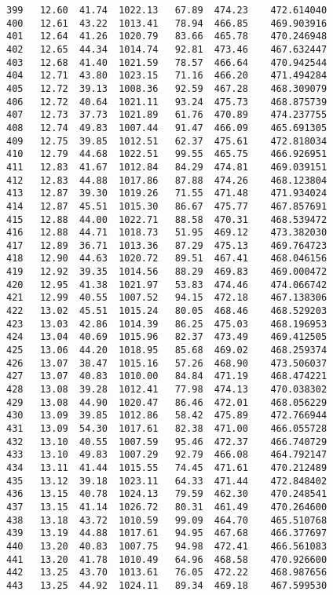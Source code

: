 \documentclass[11pt]{article}
\begin{document}
\begin{tcolorbox}[breakable, size=fbox, boxrule=.5pt, pad at break*=1mm, opacityfill=0]
\begin{Verbatim}[commandchars=\\\{\}]
399   12.60  41.74  1022.13   67.89  474.23    472.614040
400   12.61  43.22  1013.41   78.94  466.85    469.903916
401   12.64  41.26  1020.79   83.66  465.78    470.246948
402   12.65  44.34  1014.74   92.81  473.46    467.632447
403   12.68  41.40  1021.59   78.57  466.64    470.942544
404   12.71  43.80  1023.15   71.16  466.20    471.494284
405   12.72  39.13  1008.36   92.59  467.28    468.309079
406   12.72  40.64  1021.11   93.24  475.73    468.875739
407   12.73  37.73  1021.89   61.76  470.89    474.237755
408   12.74  49.83  1007.44   91.47  466.09    465.691305
409   12.75  39.85  1012.51   62.37  475.61    472.818034
410   12.79  44.68  1022.51   99.55  465.75    466.926951
411   12.83  41.67  1012.84   84.29  474.81    469.039151
412   12.83  44.88  1017.86   87.88  474.26    468.123804
413   12.87  39.30  1019.26   71.55  471.48    471.934024
414   12.87  45.51  1015.30   86.67  475.77    467.857691
415   12.88  44.00  1022.71   88.58  470.31    468.539472
416   12.88  44.71  1018.73   51.95  469.12    473.382030
417   12.89  36.71  1013.36   87.29  475.13    469.764723
418   12.90  44.63  1020.72   89.51  467.41    468.046156
419   12.92  39.35  1014.56   88.29  469.83    469.000472
420   12.95  41.38  1021.97   53.83  474.46    474.066742
421   12.99  40.55  1007.52   94.15  472.18    467.138306
422   13.02  45.51  1015.24   80.05  468.46    468.529203
423   13.03  42.86  1014.39   86.25  475.03    468.196953
424   13.04  40.69  1015.96   82.37  473.49    469.412505
425   13.06  44.20  1018.95   85.68  469.02    468.259374
426   13.07  38.47  1015.16   57.26  468.90    473.506037
427   13.07  40.83  1010.00   84.84  471.19    468.474221
428   13.08  39.28  1012.41   77.98  474.13    470.038302
429   13.08  44.90  1020.47   86.46  472.01    468.056229
430   13.09  39.85  1012.86   58.42  475.89    472.766944
431   13.09  54.30  1017.61   82.38  471.00    466.055728
432   13.10  40.55  1007.59   95.46  472.37    466.740729
433   13.10  49.83  1007.29   92.79  466.08    464.792147
434   13.11  41.44  1015.55   74.45  471.61    470.212489
435   13.12  39.18  1023.11   64.33  471.44    472.848402
436   13.15  40.78  1024.13   79.59  462.30    470.248541
437   13.15  41.14  1026.72   80.31  461.49    470.264600
438   13.18  43.72  1010.59   99.09  464.70    465.510768
439   13.19  44.88  1017.61   94.95  467.68    466.377697
440   13.20  40.83  1007.75   94.98  472.41    466.561083
441   13.20  41.78  1010.49   64.96  468.58    470.926600
442   13.25  43.70  1013.61   76.05  472.22    468.987656
443   13.25  44.92  1024.11   89.34  469.18    467.599530

\end{Verbatim}
\end{tcolorbox}
\end{document}
